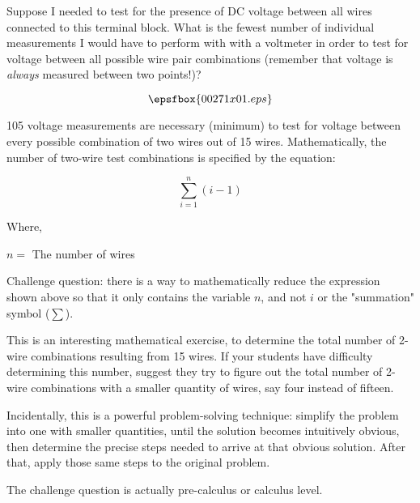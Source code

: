 

Suppose I needed to test for the presence of DC voltage between all wires connected to this terminal block.  What is the fewest number of individual measurements I would have to perform with with a voltmeter in order to test for voltage between all possible wire pair combinations (remember that voltage is {\it always} measured between two points!)?

$$\epsfbox{00271x01.eps}$$







105 voltage measurements are necessary (minimum) to test for voltage between every possible combination of two wires out of 15 wires.  Mathematically, the number of two-wire test combinations is specified by the equation:

$$\sum_{i=1}^{n} (i - 1)$$

\noindent
Where,

$n =$ The number of wires

\vskip 10pt

Challenge question: there is a way to mathematically reduce the expression shown above so that it only contains the variable $n$, and not $i$ or the "summation" symbol ($\sum$).







This is an interesting mathematical exercise, to determine the total number of 2-wire combinations resulting from 15 wires.  If your students have difficulty determining this number, suggest they try to figure out the total number of 2-wire combinations with a smaller quantity of wires, say four instead of fifteen.

Incidentally, this is a powerful problem-solving technique: simplify the problem into one with smaller quantities, until the solution becomes intuitively obvious, then determine the precise steps needed to arrive at that obvious solution.  After that, apply those same steps to the original problem.

The challenge question is actually pre-calculus or calculus level.





